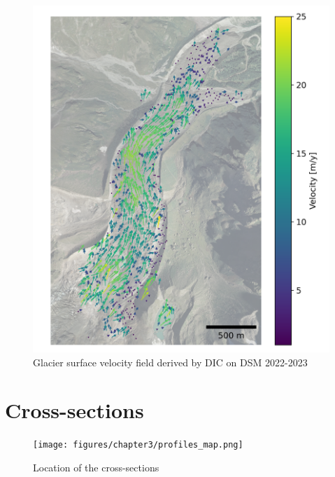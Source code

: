 \begin{figure}
    \centering
    \includegraphics[height=\textheight]{figures/chapter3/velocity_DIC_2022-2023.png}
    \caption{Glacier surface velocity field derived by DIC on DSM 2022-2023}
\end{figure}


\chapter{Cross-sections}\label{app:xsec}

\begin{figure}[p]
    \centering
    \texttt{[image: figures/chapter3/profiles\_map.png]}\\
    \caption{Location of the cross-sections}
\end{figure}

